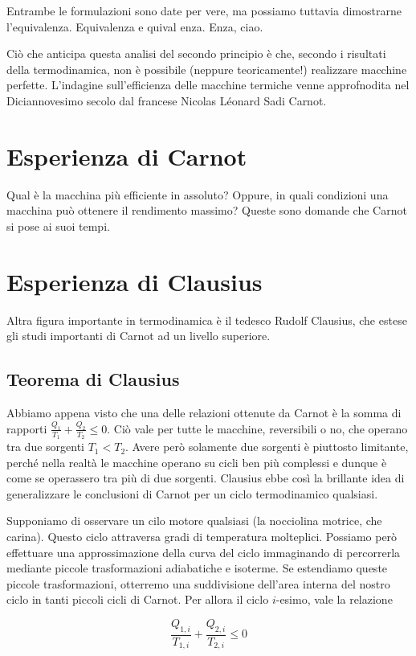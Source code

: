 Entrambe le formulazioni sono date per vere, ma possiamo tuttavia dimostrarne
l'equivalenza. Equivalenza e quival enza. Enza, ciao.

Ciò che anticipa questa analisi del secondo principio è che,
secondo i risultati della termodinamica, non è possibile
(neppure teoricamente!) realizzare macchine perfette. L'indagine
sull'efficienza delle macchine termiche venne approfnodita
nel Diciannovesimo secolo dal francese Nicolas Léonard Sadi Carnot.

\section*{Esperienza di Carnot}
Qual è la macchina più efficiente in assoluto? Oppure, in quali condizioni
una macchina può ottenere il rendimento massimo? Queste sono domande che
Carnot si pose ai suoi tempi.

\section*{Esperienza di Clausius}
Altra figura importante in termodinamica è il tedesco Rudolf Clausius,
che estese gli studi importanti di Carnot ad un livello superiore.

\subsection*{Teorema di Clausius}
Abbiamo appena visto che una delle relazioni ottenute da Carnot è la
somma di rapporti $\frac{Q_1}{T_1} + \frac{Q_2}{T_2} \leq 0$. Ciò vale
per tutte le macchine, reversibili o no, che operano tra due sorgenti
$T_1 < T_2$. Avere però solamente due sorgenti è piuttosto limitante,
perché nella realtà le macchine operano su cicli ben più complessi e
dunque è come se operassero tra più di due sorgenti. Clausius ebbe così
la brillante idea di generalizzare le conclusioni di Carnot per un
ciclo termodinamico qualsiasi.

Supponiamo di osservare un cilo motore qualsiasi (la nocciolina motrice,
che carina). Questo ciclo
attraversa gradi di temperatura molteplici. Possiamo però effettuare
una approssimazione della curva del ciclo immaginando di percorrerla
mediante piccole trasformazioni adiabatiche e isoterme. Se estendiamo
queste piccole trasformazioni, otterremo
una suddivisione dell'area interna del nostro ciclo in tanti piccoli
cicli di Carnot. Per allora il ciclo $i$-esimo, vale la relazione

\[ \frac{Q_{1,i}}{T_{1,i}} + \frac{Q_{2,i}}{T_{2,i}} \leq 0 \]


